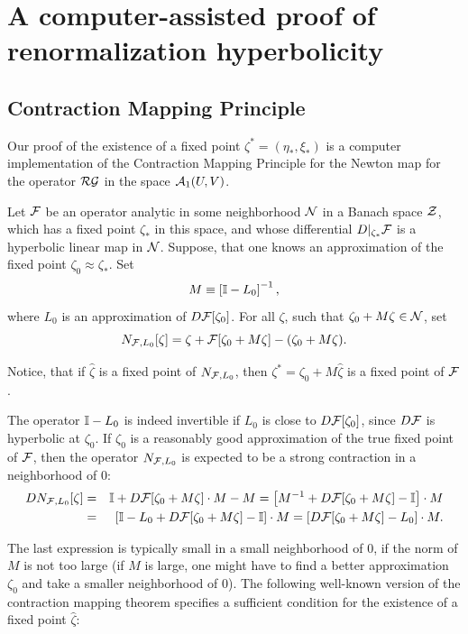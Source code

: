 
\section{A computer-assisted proof of renormalization hyperbolicity}
\label{sec:pfmain1}

\subsection{Contraction Mapping Principle}

Our proof of the existence of a fixed point $\zeta^*=(\eta_*,\xi_*)$ is a computer implementation of the Contraction Mapping Principle for the Newton map for the operator $\mathcal{RG}$ in the space  $\mathcal{A}_1(U,V)$.


Let $\mathcal{F}$ be an operator analytic in some neighborhood $\mathcal{N}$ in a Banach space $\mathcal{Z}$, which has a fixed point $\zeta_*$ in this space,
 and whose differential $D|_{\zeta_*} \mathcal{F}$ is a hyperbolic linear map in $\mathcal{N}$.  Suppose, that one knows an approximation
of the fixed point  $\zeta_0 \approx \zeta_*$.
 Set
$$M \equiv \left[ \mathbb{I}-L_0 \right]^{-1},$$
where $L_0$ is an approximation of $D \mathcal{F}[\zeta_0]$. For all $\zeta$, such that $\zeta_0+M \zeta \in \mathcal{N}$, set
$$N_{\mathcal{F},L_0}[\zeta]=\zeta+\mathcal{F}[\zeta_0+M \zeta]-(\zeta_0+M \zeta).$$


Notice, that if $\hat\zeta$ is a fixed point of $N_{\mathcal{F},L_0}$, then $\zeta^*=\zeta_0+M \hat\zeta$ is a fixed point of $\mathcal{F}$.    


The operator $\mathbb{I}-L_0$ is indeed invertible if $L_0$ is close to $D \mathcal{F}[\zeta_0]$, since $D \mathcal{F}$ is hyperbolic at $\zeta_0$. If $\zeta_0$ is a reasonably good approximation of the true fixed point of $\mathcal{F}$, then the operator $N_{\mathcal{F},L_0}$ is expected to be a strong contraction in a neighborhood of $0$:
\begin{eqnarray}
\nonumber D N_{\mathcal{F},L_0}[\zeta] &=& \mathbb{I} +D \mathcal{F}[\zeta_0+M \zeta] \cdot M -M= \left[ M^{-1} +D \mathcal{F}[\zeta_0+M \zeta]  -\mathbb{I} \right] \cdot M \\
\nonumber &=& \left[\mathbb{I}-L_0  +D \mathcal{F} [\zeta_0+M \zeta]  -\mathbb{I} \right] \cdot M = \left[ D \mathcal{F} [\zeta_0+M \zeta] - L_0 \right] \cdot M.
\end{eqnarray}

The last expression is typically small in a small neighborhood of $0$, if the norm of $M$ is not too large (if $M$ is large, one might have to find a better approximation $\zeta_0$ and take a smaller neighborhood of $0$).  The following well-known version of the contraction mapping theorem specifies a sufficient condition for the existence of a fixed point $\hat\zeta$:


